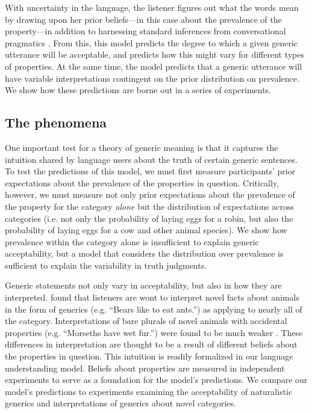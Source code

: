 \documentclass[10pt,letterpaper]{article}
\begin{document}
With uncertainty in the language, the listener figures out what the words mean by drawing upon her prior beliefs---in this case about the prevalence of the property---in addition to harnessing standard inferences from conversational pragmatics \cite{Clark1996, Grice1975, Levinson2000}. From this, this model predicts the degree to which a given generic utterance will be acceptable, and predicts how this might vary for different types of properties. At the same time, the model predicts that a generic utterance will have variable interpretations contingent on the prior distribution on prevalence. 
We show how these predictions are borne out in a series of experiments.
%
\subsection{The phenomena}

One important test for a theory of generic meaning is that it captures the intuition shared by language users about the truth of certain generic sentences. To test the predictions of this model, we must first measure participants' prior expectations about the prevalence of the properties in question. Critically, however, we must measure not only prior expectations about the prevalence of the property for the category \emph{alone} but the distribution of expectations across categories (i.e. not only the probability of laying eggs for a robin, but also the probability of laying eggs for a cow and other animal species).  
We show how prevalence within the category alone is insufficient to explain generic acceptability, but a model that considers the distribution over prevalence is sufficient to explain the variability in truth judgments.

Generic statements not only vary in acceptability, but also in how they are interpreted.  found that listeners are wont to interpret novel facts about animals in the form of generics (e.g. ``Bears like to eat ants.'') as applying to nearly all of the category. Interpretations of bare plurals of novel animals with accidental properties (e.g. ``Morseths have wet fur.'') were found to be much weaker \cite{Cimpian2010}. These differences in interpretation are thought to be a result of different beliefs about the properties in question. This intuition is readily formalized in our language understanding model. Beliefs about properties are measured in independent experiments to serve as a foundation for the model's predictions. 
We compare our model's predictions to experiments examining the acceptability of naturalistic generics and interpretations of generics about novel categories.
\end{document}
